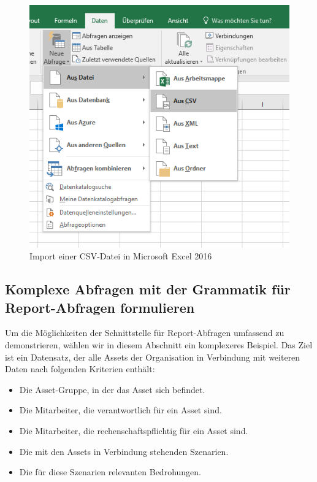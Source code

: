 \documentclass[a4paper,10pt]{book}
\providecommand{\tightlist}{%
  \setlength{\itemsep}{0pt}\setlength{\parskip}{0pt}}
\begin{document}
\begin{figure}[htb!]
  \centering
  \includegraphics[width=\linewidth]{Screenshot/import-csv-microsoft-office-2016-de.png}
  \caption{Import einer CSV-Datei in Microsoft Excel 2016}
  \label{fig:import-einer-csv-datei-in-microsoft-excel-2016}
\end{figure}

\subsection{Komplexe Abfragen mit der Grammatik für Report-Abfragen
formulieren}\label{komplexe-abfragen-mit-der-grammatik-fuxfcr-report-abfragen-formulieren}

Um die Möglichkeiten der Schnittstelle für Report-Abfragen umfassend zu
demonstrieren, wählen wir in diesem Abschnitt ein komplexeres Beispiel. Das Ziel
ist ein Datensatz, der alle Assets der Organisation in Verbindung mit weiteren
Daten nach folgenden Kriterien enthält:

\begin{itemize}
\tightlist
\item
  Die Asset-Gruppe, in der das Asset sich befindet.
\item
  Die Mitarbeiter, die verantwortlich für ein Asset sind.
\item
  Die Mitarbeiter, die rechenschaftspflichtig für ein Asset sind.
\item
  Die mit den Assets in Verbindung stehenden Szenarien.
\item
  Die für diese Szenarien relevanten Bedrohungen.
\end{itemize}
\end{document}

